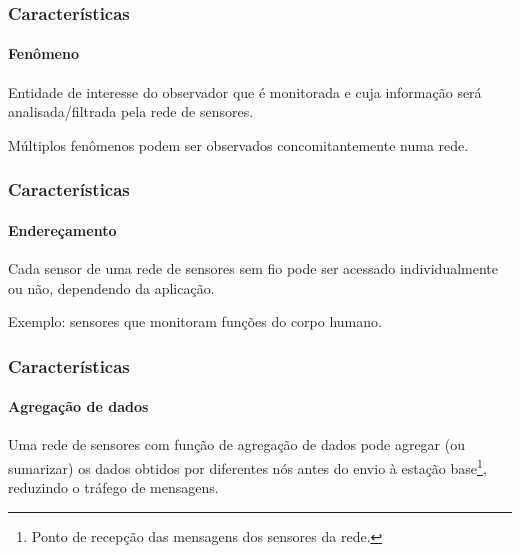 \documentclass[notes]{beamer}
\begin{document}
\begin{frame}
\frametitle{Características}
\framesubtitle{Fenômeno}

\begin{block}

Entidade de interesse do observador que é monitorada e cuja
informação será analisada/filtrada pela rede de sensores.
\end{block} \pause

\begin{block}

Múltiplos fenômenos podem ser observados concomitantemente numa rede.

\end{block}

\end{frame}

\begin{frame}
\frametitle{Características}
\framesubtitle{Endereçamento}

\begin{block}

Cada sensor de uma rede de sensores sem fio pode ser acessado individualmente ou não, dependendo da aplicação. 

\end{block} \pause

\begin{exampleblock}

Exemplo: sensores que monitoram funções do corpo humano.

\end{exampleblock}


\end{frame}

\begin{frame}
\frametitle{Características}
\framesubtitle{Agregação de dados}

\begin{block}

Uma rede de sensores com função de agregação de dados pode agregar (ou sumarizar) os dados obtidos por diferentes nós antes do envio à estação base\footnote{Ponto de recepção das mensagens dos sensores da rede.}, reduzindo o tráfego de mensagens.

\end{block}

\end{frame}
\end{document}
